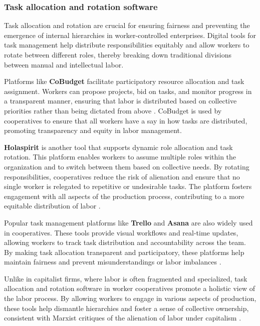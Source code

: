 \begin{refsection}
\subsubsection{Task allocation and rotation software}

Task allocation and rotation are crucial for ensuring fairness and preventing the emergence of internal hierarchies in worker-controlled enterprises. Digital tools for task management help distribute responsibilities equitably and allow workers to rotate between different roles, thereby breaking down traditional divisions between manual and intellectual labor.

Platforms like \textbf{CoBudget} facilitate participatory resource allocation and task assignment. Workers can propose projects, bid on tasks, and monitor progress in a transparent manner, ensuring that labor is distributed based on collective priorities rather than being dictated from above \cite[pp.~130-132]{restakis2012}. CoBudget is used by cooperatives to ensure that all workers have a say in how tasks are distributed, promoting transparency and equity in labor management.

\textbf{Holaspirit} is another tool that supports dynamic role allocation and task rotation. This platform enables workers to assume multiple roles within the organization and to switch between them based on collective needs. By rotating responsibilities, cooperatives reduce the risk of alienation and ensure that no single worker is relegated to repetitive or undesirable tasks. The platform fosters engagement with all aspects of the production process, contributing to a more equitable distribution of labor \cite[pp.~89-93]{wright2010}.

Popular task management platforms like \textbf{Trello} and \textbf{Asana} are also widely used in cooperatives. These tools provide visual workflows and real-time updates, allowing workers to track task distribution and accountability across the team. By making task allocation transparent and participatory, these platforms help maintain fairness and prevent misunderstandings or labor imbalances \cite[pp.~54-58]{fried2020}.

Unlike in capitalist firms, where labor is often fragmented and specialized, task allocation and rotation software in worker cooperatives promote a holistic view of the labor process. By allowing workers to engage in various aspects of production, these tools help dismantle hierarchies and foster a sense of collective ownership, consistent with Marxist critiques of the alienation of labor under capitalism \cite[pp.~105-108]{braverman1974}.


\end{refsection}
